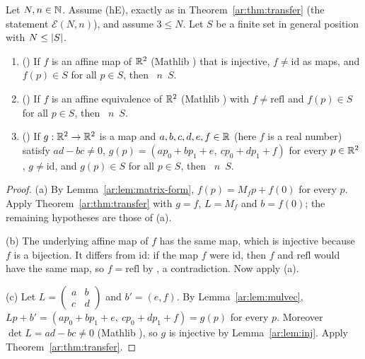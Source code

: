 \begin{corollary}\label{ar:cor:transfer-forms}
Let $N,n\in\mathbb N$. Assume \textup{(hE)}, exactly as in Theorem~\textup{\ref{ar:thm:transfer}} \textup(the statement
$\mathcal E(N,n)$\textup), and assume $3\le N$. Let $S$ be a finite set in general position with $N\le\lvert S\rvert$.
\begin{enumerate}[label=\textup{(\alph*)}]
\item \textup{(}\textup{)} If $f$ is an affine map of $\mathbb R^2$ \textup(Mathlib
\textup) that is injective, $f\ne\mathrm{id}$ as maps, and $f(p)\in S$ for all $p\in S$, then
~$n$~$S$.
\item \textup{(}\textup{)} If $f$ is an affine equivalence of $\mathbb R^2$
\textup(Mathlib \textup) with $f\ne\mathrm{refl}$ and $f(p)\in S$ for all $p\in S$, then
~$n$~$S$.
\item \textup{(}\textup{)} If $g:\mathbb R^2\to\mathbb R^2$ is a map and
$a,b,c,d,e,f\in\mathbb R$ \textup(here $f$ is a real number\textup) satisfy $ad-bc\ne0$,
$g(p)=(ap_0+bp_1+e,\ cp_0+dp_1+f)$ for every $p\in\mathbb R^2$, $g\ne\mathrm{id}$, and $g(p)\in S$ for all $p\in S$, then
~$n$~$S$.
\end{enumerate}
\end{corollary}

\begin{proof}
(a) By Lemma~\ref{ar:lem:matrix-form}, $f(p)=M_fp+f(0)$ for every $p$. Apply Theorem~\ref{ar:thm:transfer} with $g=f$,
$L=M_f$ and $b=f(0)$; the remaining hypotheses are those of (a).

(b) The underlying affine map of $f$ has the same map, which is injective because $f$ is a bijection. It differs from
$\mathrm{id}$: if the map $f$ were $\mathrm{id}$, then $f$ and $\mathrm{refl}$ would have the same map, so
$f=\mathrm{refl}$ by , a contradiction. Now apply (a).

(c) Let $L=\begin{pmatrix}a&b\\c&d\end{pmatrix}$ and $b'=(e,f)$. By Lemma~\ref{ar:lem:mulvec},
$Lp+b'=(ap_0+bp_1+e,\ cp_0+dp_1+f)=g(p)$ for every $p$. Moreover $\det L=ad-bc\ne0$ (Mathlib
), so $g$ is injective by Lemma~\ref{ar:lem:inj}. Apply Theorem~\ref{ar:thm:transfer}.
\end{proof}

